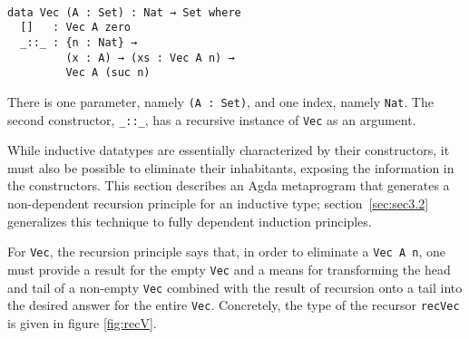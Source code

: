 \documentclass[runningheads]{llncs}
\begin{document}
\begin{center}
\fontsize{7.9pt}{2pt}\selectfont
\begin{BVerbatim}

data Vec (A : Set) : Nat → Set where
  []   : Vec A zero
  _::_ : {n : Nat} →
         (x : A) → (xs : Vec A n) → 
         Vec A (suc n)

\end{BVerbatim}
\end{center}
\normalsize

There is one parameter, namely \texttt{(A : Set)}, and one index, namely \texttt{Nat}.
The second constructor, \texttt{\_::\_}, has a recursive instance of \texttt{Vec} as an argument.




While inductive datatypes are essentially characterized by their constructors, it must also be possible to eliminate their inhabitants, exposing the information in the constructors.
This section describes an Agda metaprogram that generates a non-dependent recursion principle for an inductive type; section~\ref{sec:sec3.2} generalizes this technique to fully dependent induction principles.

For {\tt Vec}, the recursion principle says that, in order to eliminate a \texttt{Vec A n}, one must provide a result for the empty \texttt{Vec} and a means for transforming the head and tail of a non-empty \texttt{Vec} combined with the result of recursion onto a tail into the desired answer for the entire \texttt{Vec}.
Concretely, the type of the recursor \texttt{recVec} is given in figure \ref{fig:recV}.

\end{document}
